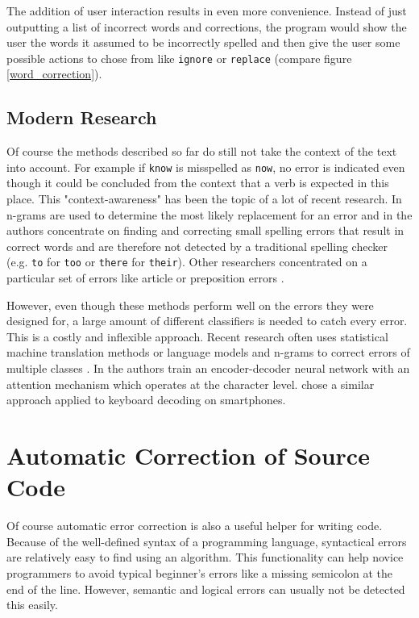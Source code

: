 The addition of user interaction results in even more convenience. Instead of just outputting a list of incorrect words and corrections, the program would show the user the words it assumed to be incorrectly spelled and then give the user some possible actions to chose from like \texttt{ignore} or \texttt{replace} (compare figure \ref{word_correction}).

\subsection{Modern Research}

Of course the methods described so far do still not take the context of the text into account. For example if \texttt{know} is misspelled as \texttt{now}, no error is indicated even though it could be concluded from the context that a verb is expected in this place. This "context-awareness" has been the topic of a lot of recent research. In \cite{context_n_gram} n-grams are used to determine the most likely replacement for an error and in \cite{context_sensitive_spelling} the authors concentrate on finding and correcting small spelling errors that result in correct words and are therefore not detected by a traditional spelling checker (e.g. \texttt{to} for \texttt{too} or \texttt{there} for \texttt{their}). Other researchers concentrated on a particular set of errors like article \cite{article_correction} or preposition errors \cite{preposition_correction}.

However, even though these methods perform well on the errors they were designed for, a large amount of different classifiers is needed to catch every error. This is a costly and inflexible approach. Recent research often uses statistical machine translation methods or language models and n-grams to correct errors of multiple classes \cite{grammatical_error_task}. In \cite{seq2seq_on_text_correction} the authors train an encoder-decoder neural network with an attention mechanism which operates at the character level. \cite{seq2seq_keyboard} chose a similar approach applied to keyboard decoding on smartphones.

\section{Automatic Correction of Source Code}
\label{code_correction_section}

Of course automatic error correction is also a useful helper for writing code. Because of the well-defined syntax of a programming language, syntactical errors are relatively easy to find using an algorithm. This functionality can help novice programmers to avoid typical beginner's errors like a missing semicolon at the end of the line. However, semantic and logical errors can usually not be detected this easily.

